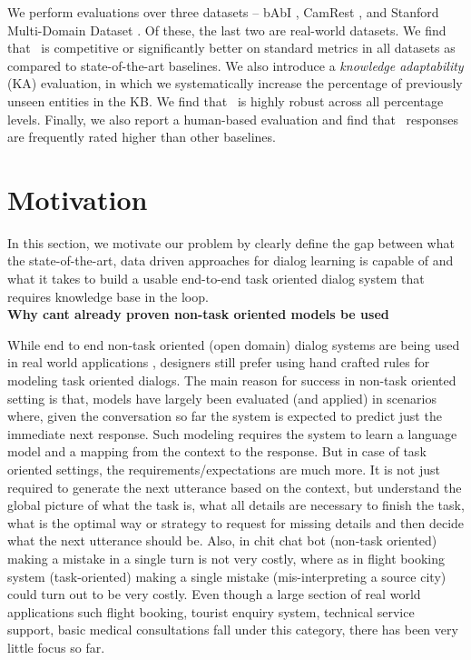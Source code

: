 We perform evaluations over three datasets -- bAbI \cite{BordesW16}, CamRest \cite{wenEMNLP2016}, and Stanford Multi-Domain Dataset \cite{Ericsigdial}. Of these, the last two are real-world datasets. We find that \sys\ is competitive or significantly better on standard metrics in all datasets as compared to state-of-the-art baselines. We also introduce a {\em knowledge adaptability} (KA) evaluation, in which we systematically increase the percentage of previously unseen entities in the KB. We find that \sys\ is highly robust across all percentage levels. Finally, we also report a human-based evaluation and find that \sys\ responses are frequently rated higher than other baselines.

\section{Motivation}
In this section, we motivate our problem by clearly define the gap between what the state-of-the-art, data driven approaches for dialog learning is capable of and what it takes to build a usable end-to-end task oriented dialog system that requires knowledge base in the loop.\\

\noindent
\textbf{Why cant already proven non-task oriented models be used}

While end to end non-task oriented (open domain) dialog systems are being used in real world applications \cite{smartreply}, designers still prefer using hand crafted rules for modeling task oriented dialogs. The main reason for success in non-task oriented setting is that, models have largely been evaluated (and applied) in scenarios where, given the conversation so far the system is expected to predict just the immediate next response. Such modeling requires the system to learn a language model and a mapping from the context to the response. But in case of task oriented settings, the requirements/expectations are much more. It is not just required to generate the next utterance based on the context, but understand the global picture of what the task is, what all details are necessary to finish the task, what is the optimal way or strategy to request for missing details and then decide what the next utterance should be. Also, in chit chat bot (non-task oriented) making a mistake in a single turn is not very costly, where as in flight booking system (task-oriented) making a single mistake (mis-interpreting a source city) could turn out to be very costly. Even though a large section of real world applications such flight booking, tourist enquiry system, technical service support, basic medical consultations fall under this category, there has been very little focus so far.

